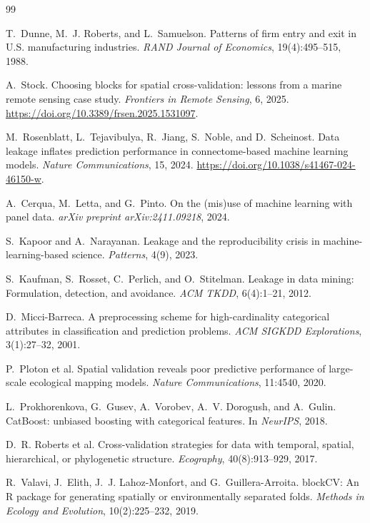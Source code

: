 \documentclass[11pt]{article}
\begin{document}

\begin{thebibliography}{99}

T.~Dunne, M.~J. Roberts, and L.~Samuelson.
\newblock Patterns of firm entry and exit in U.S. manufacturing industries.
\newblock \emph{RAND Journal of Economics}, 19(4):495--515, 1988.

A.~Stock.
\newblock Choosing blocks for spatial cross-validation: lessons from a marine
  remote sensing case study.
\newblock \emph{Frontiers in Remote Sensing}, 6, 2025.
\newblock \url{https://doi.org/10.3389/frsen.2025.1531097}.

M.~Rosenblatt, L.~Tejavibulya, R.~Jiang, S.~Noble, and D.~Scheinost.
\newblock Data leakage inflates prediction performance in connectome-based
  machine learning models.
\newblock \emph{Nature Communications}, 15, 2024.
\newblock \url{https://doi.org/10.1038/s41467-024-46150-w}.

A.~Cerqua, M.~Letta, and G.~Pinto.
\newblock On the (mis)use of machine learning with panel data.
\newblock \emph{arXiv preprint arXiv:2411.09218}, 2024.

S.~Kapoor and A.~Narayanan.
\newblock Leakage and the reproducibility crisis in machine-learning-based
  science.
\newblock \emph{Patterns}, 4(9), 2023.

S.~Kaufman, S.~Rosset, C.~Perlich, and O.~Stitelman.
\newblock Leakage in data mining: Formulation, detection, and avoidance.
\newblock \emph{ACM TKDD}, 6(4):1--21, 2012.

D.~Micci-Barreca.
\newblock A preprocessing scheme for high-cardinality categorical attributes in
  classification and prediction problems.
\newblock \emph{ACM SIGKDD Explorations}, 3(1):27--32, 2001.

P.~Ploton et al.
\newblock Spatial validation reveals poor predictive performance of large-scale
  ecological mapping models.
\newblock \emph{Nature Communications}, 11:4540, 2020.

L.~Prokhorenkova, G.~Gusev, A.~Vorobev, A.~V. Dorogush, and A.~Gulin.
\newblock CatBoost: unbiased boosting with categorical features.
\newblock In \emph{NeurIPS}, 2018.

D.~R. Roberts et al.
\newblock Cross-validation strategies for data with temporal, spatial,
  hierarchical, or phylogenetic structure.
\newblock \emph{Ecography}, 40(8):913--929, 2017.

R.~Valavi, J.~Elith, J.~J. Lahoz-Monfort, and G.~Guillera-Arroita.
\newblock blockCV: An R package for generating spatially or environmentally
  separated folds.
\newblock \emph{Methods in Ecology and Evolution}, 10(2):225--232, 2019.

\end{thebibliography}
\end{document}
